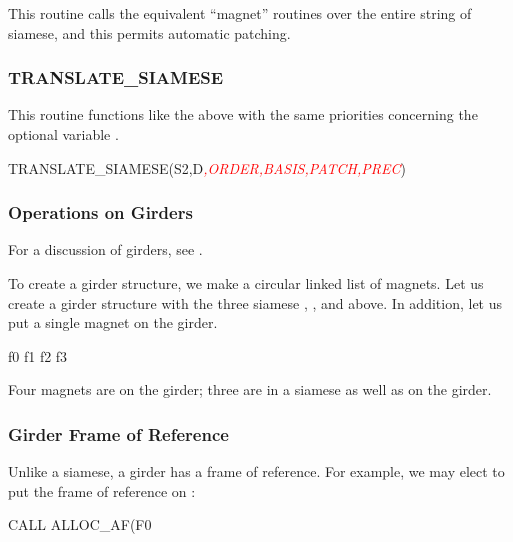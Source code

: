 This routine calls the equivalent ``magnet'' routines over the entire string
of siamese, and this permits automatic patching.


\subsubsection*{TRANSLATE_SIAMESE}

%
This routine functions like the above  with the same
priorities concerning the optional variable .

\begin{ptccode}
TRANSLATE_SIAMESE(S2,D\textit{\textcolor{red}{,ORDER,BASIS,PATCH,PREC}})
\end{ptccode}


\subsubsection{Operations on Girders}
\label{sec:ops.girders}

For a discussion of girders, see .

%
To create a girder structure, we make a circular linked list of magnets.
Let us create a girder structure with the three siamese , ,
and  above. In addition, let us put a single magnet  on the girder.

\begin{ptccode}
f0%
f1%
f2%
f3%
\end{ptccode}

Four magnets are on the girder; three are in a siamese as well as on the girder.


\subsubsection*{Girder Frame of Reference}

%
Unlike a siamese, a girder has a frame of reference. For example, we
may elect to put the frame of reference on :

\begin{ptccode}
CALL ALLOC_AF(F0%
\end{ptccode}

